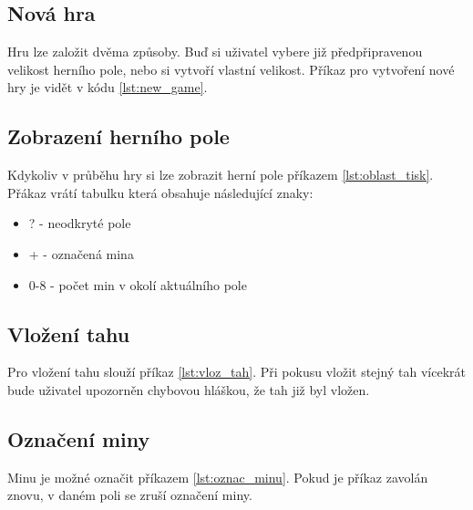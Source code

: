 \documentclass{article}
\begin{document}
\subsection{Nová hra}
Hru lze založit dvěma způsoby. Buď si uživatel vybere již předpřipravenou
velikost herního pole, nebo si vytvoří vlastní velikost.
Příkaz pro vytvoření nové hry je vidět v kódu \ref{lst:new_game}.

\begin{minipage}{\linewidth}

\end{minipage}

\subsection{Zobrazení herního pole}
Kdykoliv v průběhu hry si lze zobrazit herní pole příkazem \ref{lst:oblast_tisk}.
Přákaz vrátí tabulku která obsahuje následující znaky:
\begin{itemize}
    \item ? - neodkryté pole
    \item + - označená mina
    \item 0-8 - počet min v okolí aktuálního pole
\end{itemize}

\begin{minipage}{\linewidth}

\end{minipage}

\subsection{Vložení tahu}
Pro vložení tahu slouží příkaz \ref{lst:vloz_tah}.
Při pokusu vložit stejný tah vícekrát bude uživatel
upozorněn chybovou hláškou, že tah již byl vložen.


\begin{minipage}{\linewidth}

\end{minipage}

\subsection{Označení miny}
Minu je možné označit příkazem \ref{lst:oznac_minu}.
Pokud je příkaz zavolán znovu, v daném poli se zruší označení miny.
\end{document}

